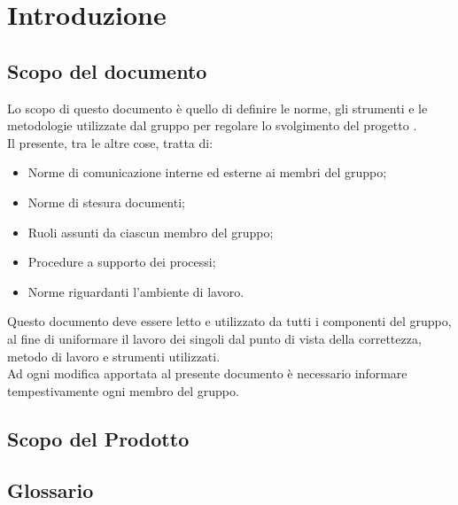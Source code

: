 \section{Introduzione}

\subsection{Scopo del documento}

Lo scopo di questo documento è quello di definire le norme, gli strumenti e le metodologie utilizzate dal gruppo \GroupName per regolare lo svolgimento del progetto \ProjectName{}.\\
Il presente, tra le altre cose, tratta di:
\begin{itemize}
	\item Norme di comunicazione interne ed esterne ai membri del gruppo;
	\item Norme di stesura documenti;
	\item Ruoli assunti da ciascun membro del gruppo;
	\item Procedure a supporto dei processi;
	\item Norme riguardanti l’ambiente di lavoro.
\end{itemize}
Questo documento deve essere letto e utilizzato da tutti i componenti del gruppo, al fine di uniformare il lavoro dei singoli dal punto di vista della correttezza, metodo di lavoro e strumenti utilizzati.\\
Ad ogni modifica apportata al presente documento è necessario informare tempestivamente ogni membro del gruppo.
\subsection{Scopo del Prodotto}
\ScopoDelProdotto

\subsection{Glossario}
\GlossarioIntroduzione






